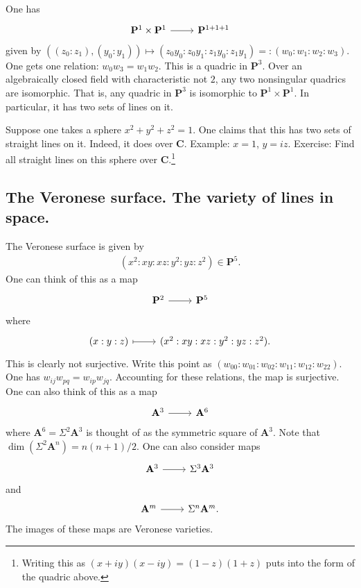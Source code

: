 \documentclass [11 pt, oneside] {article}
\begin{document}
\begin{example}\label{seg}
One has
\[
\begin{tikzcd}
\mathbf{P}^1\times \mathbf{P}^1\ar[r]& \mathbf{P}^{1+1+1}
\end{tikzcd}
\]
given by $((z_0:z_1), (y_0:y_1)) \longmapsto (z_0y_0:z_0y_1: z_1y_0: z_1y_1) =:(w_0:w_1:w_2:w_3)$. One gets one relation: $w_0w_3=w_1w_2$. This is a quadric in $\mathbf{P}^3$. Over an algebraically closed field with characteristic not $2$, any two nonsingular quadrics are isomorphic. That is, any quadric in $\mathbf{P}^3$ is isomorphic to $\mathbf{P}^1\times \mathbf{P}^1$. In particular, it has two sets of lines on it. 

Suppose one takes a sphere $x^2+y^2+z^2=1$. One claims that this has two sets of straight lines on it. Indeed, it does over $\mathbf{C}$. Example: $x=1$, $y=iz$. Exercise: Find all straight lines on this sphere over $\mathbf{C}$.\footnote{Writing this as $(x+iy) (x-iy)= (1-z) (1+z)$ puts into the form of the quadric above.}
\end{example}


\subsection{The Veronese surface. The variety of lines in space.}

\begin{example}\label{}
 The Veronese surface is given by
\begin{align*}
	(x^2:xy:xz:y^2:yz:z^2)\in  \mathbf{P}^5.
\end{align*}
One can think of this as a map 
\[
\begin{tikzcd}
\mathbf{P}^2\ar[r]& \mathbf{P}^5
\end{tikzcd}
\]
where
\[
\begin{tikzcd}
(x:y:z) \ar[r,mapsto]& (x^2:xy:xz:y^2:yz:z^2).
\end{tikzcd}
\]
This is clearly not surjective. Write this point as $(w_{00}:w_{01}:w_{02}:w_{11}:w_{12}:w_{22})$. One has $w_{ij}w_{pq} = w_{ip}w_{jq}$. Accounting for these relations, the map is surjective. One can also think of this as a map 
\[
\begin{tikzcd}
\mathbf{A}^3\ar[r]& \mathbf{A}^6
\end{tikzcd}
\]
where $\mathbf{A}^6 = \Sigma^2\mathbf{A}^3$ is thought of as the symmetric square of $\mathbf{A}^3$. 
Note that $\dim (\Sigma^2\mathbf{A}^n) = n(n+1)/2$. One can also consider maps 
\[
\begin{tikzcd}
\mathbf{A}^3\ar[r]& \Sigma^3 \mathbf{A}^3
\end{tikzcd}
\]
and 
\[
\begin{tikzcd}
\mathbf{A}^m \ar[r]& \Sigma^n \mathbf{A}^m.
\end{tikzcd}
\]
The images of these maps are Veronese varieties.
\end{example}
\end{document}
